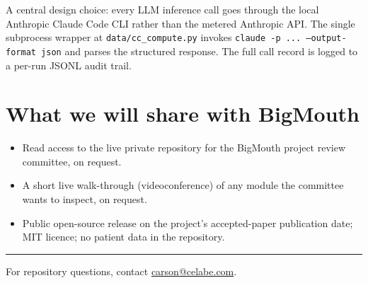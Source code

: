 \documentclass[11pt,letterpaper]{article}
\begin{document}
A central design choice: every LLM inference call goes through the local
Anthropic Claude Code CLI rather than the metered Anthropic API. The
single subprocess wrapper at \texttt{data/cc\_compute.py} invokes
\texttt{claude -p ...\ --output-format json} and parses the structured
response. The full call record is logged to a per-run JSONL audit
trail.

\section*{What we will share with BigMouth}

\begin{itemize}\itemsep0pt
    \item Read access to the live private repository for the BigMouth
    project review committee, on request.
    \item A short live walk-through (videoconference) of any module the
    committee wants to inspect, on request.
    \item Public open-source release on the project's accepted-paper
    publication date; MIT licence; no patient data in the repository.
\end{itemize}

\bigskip

\hrule
\bigskip

\noindent For repository questions, contact
\href{mailto:carson@celabe.com}{carson@celabe.com}.
\end{document}
